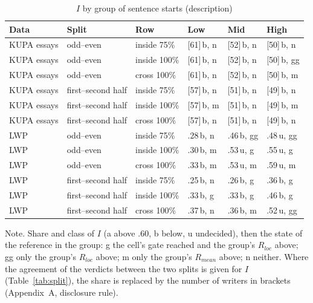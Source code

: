 \begin{table}[htbp]
\caption{$I$ by group of sentence starts (description)}
\label{tab:igroups}
\footnotesize
\begin{tabularx}{\linewidth}{@{}lllXXX@{}}
\toprule
Data & Split & Row & Low & Mid & High \\
\midrule
KUPA essays & odd--even & inside 75\% & [61]\,b, n & [52]\,b, n & [50]\,b, n \\
KUPA essays & odd--even & inside 100\% & [61]\,b, n & [52]\,b, n & [50]\,b, gg \\
KUPA essays & odd--even & cross 100\% & [61]\,b, n & [52]\,b, n & [50]\,b, m \\
KUPA essays & first--second half & inside 75\% & [57]\,b, n & [51]\,b, n & [49]\,b, n \\
KUPA essays & first--second half & inside 100\% & [57]\,b, m & [51]\,b, n & [49]\,b, m \\
KUPA essays & first--second half & cross 100\% & [57]\,b, n & [51]\,b, n & [49]\,b, n \\
LWP & odd--even & inside 75\% & .28\,b, n & .46\,b, gg & .48\,u, gg \\
LWP & odd--even & inside 100\% & .30\,b, m & .53\,u, g & .55\,u, g \\
LWP & odd--even & cross 100\% & .33\,b, m & .53\,u, m & .59\,u, m \\
LWP & first--second half & inside 75\% & .25\,b, n & .26\,b, g & .36\,b, g \\
LWP & first--second half & inside 100\% & .33\,b, g & .33\,b, g & .46\,b, g \\
LWP & first--second half & cross 100\% & .37\,b, n & .36\,b, m & .52\,u, gg \\
\bottomrule
\end{tabularx}
\par\smallskip\footnotesize Note. Share and class of $I$ (a above .60, b below, u undecided), then the state of the reference in the group: g the cell's gate reached and the group's $R_{loc}$ above; gg only the group's $R_{loc}$ above; m only the group's $R_{mean}$ above; n neither. Where the agreement of the verdicts between the two splits is given for $I$ (Table~\ref{tab:split}), the share is replaced by the number of writers in brackets (Appendix~A, disclosure rule).
\end{table}
